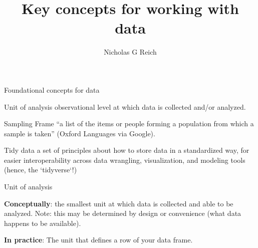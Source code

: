 \documentclass[table]{beamer}\usepackage[]{graphicx}\usepackage[]{color}
\title{Key concepts for working with data}
\author{Nicholas G Reich}
\begin{document}
\begin{frame}[plain]
	\titlepage
\end{frame}






\begin{frame}{Foundational concepts for data}


\begin{block}{Unit of analysis}
\bi
	\myitem observational level at which data is collected and/or analyzed.
\ei
\end{block}


\begin{block}{Sampling Frame}
\bi
	\myitem ``a list of the items or people forming a population from which a sample is taken'' (Oxford Languages via Google).
\ei
\end{block}


\begin{block}{Tidy data}
\bi
	\myitem a set of principles about how to store data in a standardized way, for easier interoperability across data wrangling, visualization, and modeling tools (hence, the `tidyverse`!)
\ei
\end{block}



\end{frame}


\begin{frame}{Unit of analysis}

{\bf Conceptually}: the smallest unit at which data is collected and able to be analyzed. Note: this may be determined by design or convenience (what data happens to be available).

\vspace{4em}

{\bf In practice}: The unit that defines a row of your data frame.



\end{frame}


\end{document}
